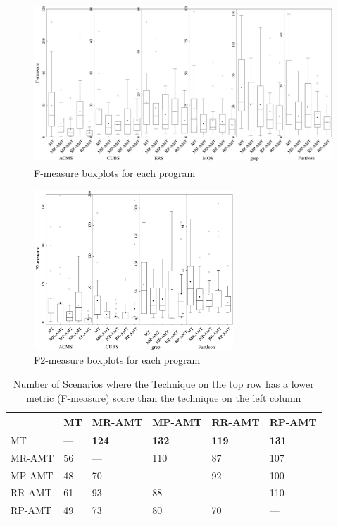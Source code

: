 \documentclass[10pt,journal,compsoc]{IEEEtran}
\begin{document}
\begin{figure}[htb]
  \centering
  \includegraphics[width = \textwidth,height=6cm]{fig//fmeasure}
  \caption{F-measure boxplots for each program}
  \label{fig:fmeasure}
\end{figure}

\begin{figure}[htb]
  \centering
  \includegraphics[width = 0.67\textwidth,height=6cm]{fig//f2measure}
  \caption{F2-measure boxplots for each program}
  \label{fig:f2measure}
\end{figure}



\begin{table}[htbp]
  \caption{Number of Scenarios where the Technique on the top row has a lower metric (F-measure) score than the technique on the left column}
  \centering
  \label{tableHlom:f}
  \renewcommand\tabcolsep{4.0pt}
  \begin{tabular}{llllll}  \toprule
             &MT      &MR-AMT             &MP-AMT             &RR-AMT             &RP-AMT  \\ \midrule
    MT       &---     &\textbf{124}       &\textbf{132}       &\textbf{119}       &\textbf{131}     \\
    MR-AMT   &56      &---                &110                &87                 &107 \\
    MP-AMT   &48      &70                 &---                &92                 &100 \\
    RR-AMT   &61      &93                 &88                 &---                &110 \\
    RP-AMT   &49      &73                 &80                 &70                 &--- \\ \bottomrule
  \end{tabular}
\end{table}
\end{document}
